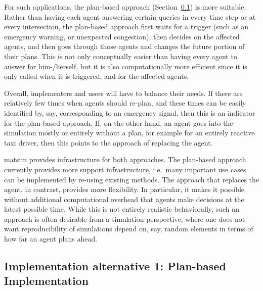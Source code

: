 For such applications, the plan-based approach (Section~\ref{sec:impl-plan-based}) is more suitable.  Rather than having each agent answering certain queries in every time step or at every intersection, the plan-based approach first waits for a trigger (such as an emergency warning, or unexpected congestion), then decides on the affected agents, and then goes through those agents and changes the future portion of their plans.   This is not only conceptually easier than having every agent to answer for him-/herself, but it is also computationally more efficient since it is only called when it is triggered, and for the affected agents. 

Overall, implementers and users will have to balance their needs.  
%
If there are relatively few times when agents should re-plan, and these times can be easily identified by, say, corresponding to an emergency signal, then this is an indicator for the plan-based approach.  
%
If, on the other hand, an agent goes into the simulation mostly or entirely without a plan, for example for an entirely reactive taxi driver, then this points to the approach of replacing the agent.

\acrshort{matsim} provides infrastructure for both approaches.  The plan-based approach currently provides more support infrastructure, i.e.\ many important use cases can be implemented by re-using existing methods.  The approach that replaces the agent, in contrast, provides more flexibility.  In particular, it makes it possible without additional computational overhead that agents make decisions at the latest possible time.  While this is not entirely realistic behaviorally, such an approach is often desirable from a simulation perspective, where one does not want reproducibility of simulations depend on, say, random elements in terms of how far an agent plans ahead.



\subsection{Implementation alternative 1: Plan-based Implementation}
\label{sec:impl-plan-based}


